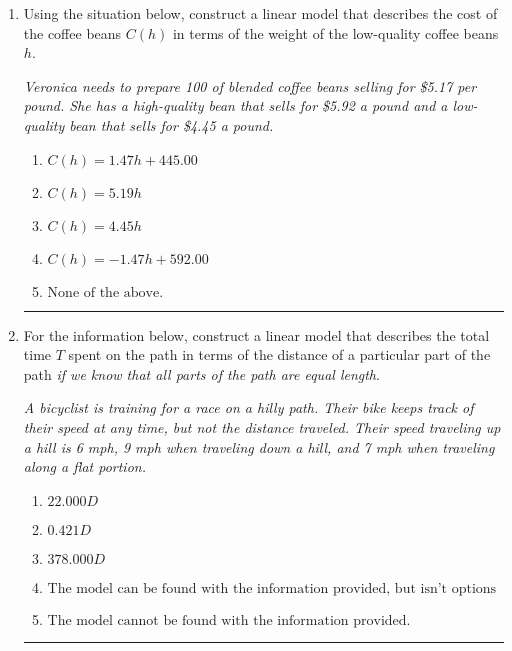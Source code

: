 \documentclass[14pt]{extbook}
\newcommand{\litem}[1]{\item#1\hspace*{-1cm}\rule{\textwidth}{0.4pt}}
\begin{document}
\begin{enumerate}
{\begin{enumerate}[label=\Alph*.]
\end{enumerate} }
\litem{
Using the situation below, construct a linear model that describes the cost of the coffee beans $C(h)$ in terms of the weight of the low-quality coffee beans $h$.
\begin{center}
    \textit{ Veronica needs to prepare 100 of blended coffee beans selling for \$5.17 per pound. She has a high-quality bean that sells for \$5.92 a pound and a low-quality bean that sells for \$4.45 a pound. }
\end{center}
\begin{enumerate}[label=\Alph*.]
\item \( C(h) = 1.47 h + 445.00 \)
\item \( C(h) = 5.19 h \)
\item \( C(h) = 4.45 h \)
\item \( C(h) = -1.47 h + 592.00 \)
\item \( \text{None of the above.} \)

\end{enumerate} }
\litem{
For the information below, construct a linear model that describes the total time $T$ spent on the path in terms of the distance of a particular part of the path \textit{if we know that all parts of the path are equal length}.
\begin{center}
    \textit{ A bicyclist is training for a race on a hilly path. Their bike keeps track of their speed at any time, but not the distance traveled. Their speed traveling up a hill is 6 mph, 9 mph when traveling down a hill, and 7 mph when traveling along a flat portion. }
\end{center}
\begin{enumerate}[label=\Alph*.]
\item \( 22.000 D \)
\item \( 0.421 D \)
\item \( 378.000 D \)
\item \( \text{The model can be found with the information provided, but isn't options 1-3.} \)
\item \( \text{The model cannot be found with the information provided.} \)


\end{enumerate}}
\end{enumerate}
\end{document}

